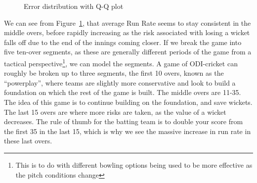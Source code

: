 \begin{figure}[h]
    \centering
    \qquad
    \caption{Error distribution with Q-Q plot}
    \label{errDistQQ3}
\end{figure}
\label{errdistqq3}
We can see from Figure~\ref{errDistQQ3}, that average Run Rate seems to stay consistent in the middle overs, before rapidly increasing as the risk associated with losing 
a wicket falls off due to the end of the innings coming closer. If we break the game into five ten-over segments, as these are generally different periods of the game
from a tactical perspective\footnote{This is to do with different bowling options being used to be more effective as the pitch conditions change}, we can model the segments.
A game of ODI-cricket can roughly be broken up to three segments, the first 10 overs, known as the ``powerplay'', where teams are slightly more conservative and look to build a 
foundation on which the rest of the game is built. The middle overs are 11-35. The idea of this game is to continue building on the foundation, and save wickets. The last 
15 overs are where more risks are taken, as the value of a wicket decreases. The rule of thumb for the batting team is to double your score from the first 35 in the last 15, which is why we see the massive 
increase in run rate in these last overs. \\

